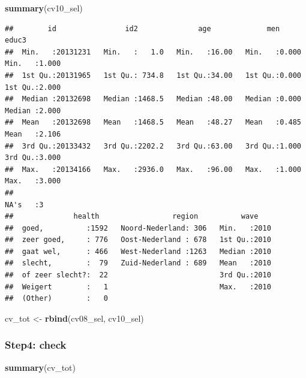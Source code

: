 \documentclass[
]{book}
\newenvironment{Shaded}{\begin{snugshade}}{\end{snugshade}}
\newcommand{\KeywordTok}[1]{\textcolor[rgb]{0.13,0.29,0.53}{\textbf{#1}}}
\newcommand{\NormalTok}[1]{#1}
\newcommand{\StringTok}[1]{\textcolor[rgb]{0.31,0.60,0.02}{#1}}
\begin{document}
\begin{Shaded}
\begin{Highlighting}[numbers=left,,]
\KeywordTok{summary}\NormalTok{(cv10_sel)}
\end{Highlighting}
\end{Shaded}

\begin{verbatim}
##        id                id2              age             men            educ3      
##  Min.   :20131231   Min.   :   1.0   Min.   :16.00   Min.   :0.000   Min.   :1.000  
##  1st Qu.:20131965   1st Qu.: 734.8   1st Qu.:34.00   1st Qu.:0.000   1st Qu.:2.000  
##  Median :20132698   Median :1468.5   Median :48.00   Median :0.000   Median :2.000  
##  Mean   :20132698   Mean   :1468.5   Mean   :48.27   Mean   :0.485   Mean   :2.106  
##  3rd Qu.:20133432   3rd Qu.:2202.2   3rd Qu.:63.00   3rd Qu.:1.000   3rd Qu.:3.000  
##  Max.   :20134166   Max.   :2936.0   Max.   :96.00   Max.   :1.000   Max.   :3.000  
##                                                                      NA's   :3      
##              health                 region          wave     
##  goed,          :1592   Noord-Nederland: 306   Min.   :2010  
##  zeer goed,     : 776   Oost-Nederland : 678   1st Qu.:2010  
##  gaat wel,      : 466   West-Nederland :1263   Median :2010  
##  slecht,        :  79   Zuid-Nederland : 689   Mean   :2010  
##  of zeer slecht?:  22                          3rd Qu.:2010  
##  Weigert        :   1                          Max.   :2010  
##  (Other)        :   0
\end{verbatim}

\begin{Shaded}
\begin{Highlighting}[numbers=left,,]
\NormalTok{cv_tot <-}\StringTok{ }\KeywordTok{rbind}\NormalTok{(cv08_sel, cv10_sel)}
\end{Highlighting}
\end{Shaded}

\hypertarget{step4-check}{%
\subsubsection{Step4: check}\label{step4-check}}

\begin{Shaded}
\begin{Highlighting}[numbers=left,,]
\KeywordTok{summary}\NormalTok{(cv_tot)}
\end{Highlighting}
\end{Shaded}
\end{document}
